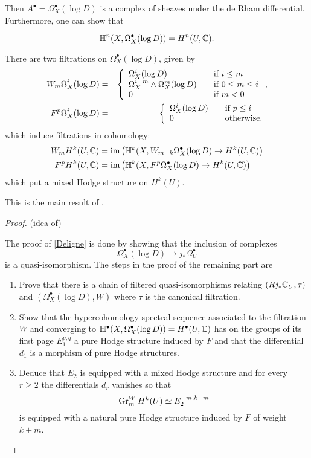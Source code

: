 \documentclass[../main.tex]{subfiles}
\begin{document}
Then $A^\bullet=\Omega_X^\bullet(\log D)$ is a complex of sheaves under the de Rham differential. Furthermore, one can show that
\begin{theorem} \textup{\cite[Thm. 4.2]{PS08}} \label{DelMainThm}
\begin{equation} \label{Deligne}
    \mathbb{H}^n(X,\Omega_X^\bullet(\log D)) = H^n(U,\mathbb{C}).
\end{equation}

There are two filtrations on $\Omega^\bullet_X(\log D)$, given by
\begin{eqnarray*}
W_m\Omega^i_X(\log D) &=& \left\{\begin{array}{ll} \Omega^i_X(\log D)&\hbox{if }i\le m\\ \Omega_X^{i-m}\wedge\Omega^m_X(\log D)\quad&\hbox{if }0\le m\le i\\0&\hbox{if }m<0\end{array}\right.,\\
F^p\Omega^i_X(\log D) &=& \left\{\begin{array}{ll} \Omega^i_X(\log D)\quad&\hbox{if }p\le i\\ 0&\hbox{otherwise.}\end{array}\right.
\end{eqnarray*}
which induce filtrations in cohomology:
\begin{align*}
    W_mH^k(U,\mathbb{C}) &= \operatorname{im} \left( \mathbb{H}^k(X,W_{m-k}\Omega^\bullet_X(\log D) \to H^k(U,\mathbb{C}) \right)  \\
    F^pH^k(U,\mathbb{C}) &= \operatorname{im} \left( \mathbb{H}^k(X,F^p\Omega^\bullet_X(\log D) \to H^k(U,\mathbb{C}) \right)
\end{align*}
which put a mixed Hodge structure on $H^k(U)$.
\end{theorem} 
This is the main result of \cite{Del71}. 

\begin{proof}{(idea of)}
    
The proof of \eqref{Deligne} is done by showing that the inclusion of complexes
\[
\Omega^\bullet_X( \log D) \to j_*\Omega^\bullet_U
\]
is a quasi-isomorphism.
The steps in the proof of the remaining part are
\begin{enumerate}
    \item Prove that there is a chain of filtered quasi-isomorphisms relating $(Rj_*\mathbb{C}_U,\tau)$ and $(\Omega_X^\bullet( \log D),W)$ where $\tau$ is the canonical filtration.
    \item Show that the hypercohomology spectral sequence associated to the filtration $W$ and converging to $\mathbb{H}^\bullet(X,\Omega^\bullet_X( \log D) ) = H^\bullet(U,\mathbb{C})$ has on the groups of its first page $E^{p,q}_1$ a pure Hodge structure induced by $F$ and that the differential $d_1$ is a morphism of pure Hodge structures.
    \item Deduce that $E_2$ is equipped with a mixed Hodge structure and for every $r \geq 2$ the differentials $d_r$ vanishes so that
    \[
 \operatorname{Gr}^W_m H^k(U) \simeq E^{-m,k+m}_2
    \]
is equipped with a natural pure Hodge structure induced by $F$ of weight $k + m$.
\end{enumerate}

\end{proof}
\end{document}
